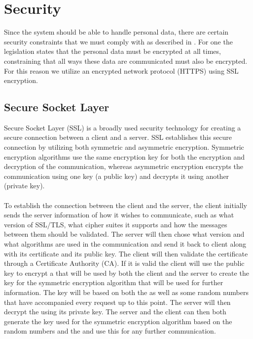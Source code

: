 \section{Security}
Since the system should be able to handle personal data, there are certain security constraints that we must comply with as described in . For one the legislation states that the personal data must be encrypted at all times, constraining that all ways these data are communicated must also be encrypted. For this reason we utilize an encrypted network protocol (HTTPS) using SSL encryption.

\subsection{Secure Socket Layer}
\label{sub:secure_socket_layer}
Secure Socket Layer (SSL) is a broadly used security technology for creating a secure connection between a client and a server. SSL establishes this secure connection by utilizing both symmetric and asymmetric encryption. Symmetric encryption algorithms use the same encryption key for both the encryption and decryption of the communication, whereas asymmetric encryption encrypts the communication using one key (a public key) and decrypts it using another (private key). 
\\\\
To establish the connection between the client and the server, the client initially sends the server information of how it wishes to communicate, such as what version of SSL/TLS, what cipher suites it supports and how the messages between them should be validated. The server will then chose what version and what algorithms are used in the communication and send it back to client along with its certificate and its public key. The client will then validate the certificate through a Certificate Authority (CA). If it is valid the client will use the public key to encrypt a  that will be used by both the client and the server to create the key for the symmetric encryption algorithm that will be used for further information. The key will be based on both the  as well as some random numbers that have accompanied every request up to this point. The server will then decrypt the  using its private key. The server and the client can then both generate the key used for the symmetric encryption algorithm based on the random numbers and the  and use this for any further communication.
